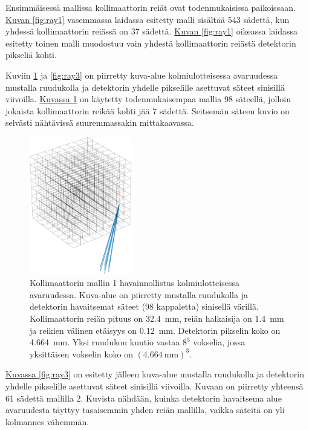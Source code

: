 Ensimmäisessä mallissa kollimaattorin reiät ovat todenmukaisissa paikoissaan. \hyperref[fig:ray1]{Kuvan \ref*{fig:ray1}} vasemmassa laidassa esitetty malli sisältää 543 sädettä, kun yhdessä kollimaattorin reiässä on 37 sädettä. \hyperref[fig:ray1]{Kuvan \ref*{fig:ray1}} oikeassa laidassa esitetty toinen malli muodostuu vain yhdestä kollimaattorin reiästä detektorin pikseliä kohti. 

Kuviin \ref{fig:ray2} ja \ref{fig:ray3} on piirretty kuva-alue kolmiulotteisessa avaruudessa mustalla ruudukolla ja detektorin yhdelle pikselille asettuvat säteet sinisillä viivoilla. \hyperref[fig:ray2]{Kuvassa \ref*{fig:ray2}} on käytetty todenmukaisempaa mallia 98 säteellä, jolloin jokaista kollimaattorin reikää kohti jää 7 sädettä. Seitsemän säteen kuvio on selvästi nähtävissä suuremmassakin mittakaavassa.

\begin{figure}[H]
    \centering
    \captionsetup{width=.9\textwidth}
    \includegraphics[height=6cm]{kuvat/3d-kollimaattori1.pdf}
    \caption{Kollimaattorin mallin 1 havainnollistus kolmiulotteisessa avaruudessa. Kuva-alue on piirretty mustalla ruudukolla ja detektorin havaitsemat säteet (98 kappaletta) sinisellä värillä. Kollimaattorin reiän pituus on \qty{32.4}{\milli\meter}, reiän halkaisija on \qty{1.4}{\milli\meter} ja reikien välinen etäisyys on \qty{0.12}{\milli\meter}. Detektorin pikselin koko on \qty{4.664}{\milli\meter}. Yksi ruudukon kuutio vastaa $8^3$ vokselia, jossa yksittäisen vokselin koko on $(\qty{4.664}{\milli\meter})^{3}$.}
    \label{fig:ray2}
\end{figure}

\hyperref[fig:ray3]{Kuvassa \ref*{fig:ray3}} on esitetty jälleen kuva-alue mustalla ruudukolla ja detektorin yhdelle pikselille asettuvat säteet sinisillä viivoilla. Kuvaan on piirretty yhteensä 61 sädettä mallilla 2. Kuvista nähdään, kuinka detektorin havaitsema alue avaruudesta täyttyy tasaisemmin yhden reiän mallilla, vaikka säteitä on yli kolmannes vähemmän.

